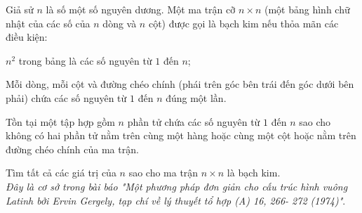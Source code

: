 \begin{ex}%
	Giả sử $n$ là số một số nguyên dương. Một ma trận cỡ $n\times n$ (một bảng hình chữ nhật của các số của $n$ dòng và $n$ cột) được gọi là bạch kim nếu thỏa mãn các điều kiện:
	\begin{enumEX}[(i)]{1}
		\item $n^{2}$ trong bảng là các số nguyên từ $1$ đến $n$;
		\item Mỗi dòng, mỗi cột và đường chéo chính (phái trên góc bên trái đến góc dưới bên phải) chứa các số nguyên từ $1$ đến $n$ đúng một lần.
		\item Tồn tại một tập hợp gồm $n$ phần tử chứa các số nguyên từ $1$ đến $n$ sao cho không có hai phần tử nằm trên cùng một hàng hoặc cùng một cột hoặc nằm trên đường chéo chính của ma trận.
	\end{enumEX}
Tìm tất cả các giá trị của $n$ sao cho ma trận $n\times n$ là bạch kim.\\
{\it{Đây là cơ sở trong bài báo "Một phương pháp đơn giản cho cấu trúc  hình vuông Latinh bởi Ervin Gergely, tạp chí về lý thuyết tổ hợp (A) 16, 266- 272 (1974)"}}.
\end{ex}

